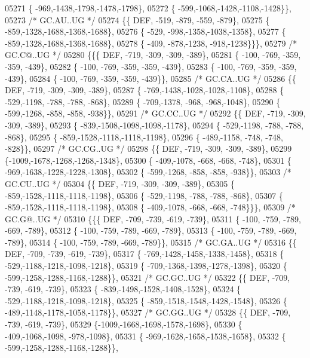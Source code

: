 \begin{DoxyCode}
05271 \{ -969,-1438,-1798,-1478,-1798\},
05272 \{ -599,-1068,-1428,-1108,-1428\}\},
05273 \textcolor{comment}{/* GC.AU..UG */}
05274 \{\{  DEF, -519, -879, -559, -879\},
05275 \{ -859,-1328,-1688,-1368,-1688\},
05276 \{ -529, -998,-1358,-1038,-1358\},
05277 \{ -859,-1328,-1688,-1368,-1688\},
05278 \{ -409, -878,-1238, -918,-1238\}\}\},
05279 \textcolor{comment}{/* GC.C@..UG */}
05280 \{\{\{  DEF, -719, -309, -309, -389\},
05281 \{ -100, -769, -359, -359, -439\},
05282 \{ -100, -769, -359, -359, -439\},
05283 \{ -100, -769, -359, -359, -439\},
05284 \{ -100, -769, -359, -359, -439\}\},
05285 \textcolor{comment}{/* GC.CA..UG */}
05286 \{\{  DEF, -719, -309, -309, -389\},
05287 \{ -769,-1438,-1028,-1028,-1108\},
05288 \{ -529,-1198, -788, -788, -868\},
05289 \{ -709,-1378, -968, -968,-1048\},
05290 \{ -599,-1268, -858, -858, -938\}\},
05291 \textcolor{comment}{/* GC.CC..UG */}
05292 \{\{  DEF, -719, -309, -309, -389\},
05293 \{ -839,-1508,-1098,-1098,-1178\},
05294 \{ -529,-1198, -788, -788, -868\},
05295 \{ -859,-1528,-1118,-1118,-1198\},
05296 \{ -489,-1158, -748, -748, -828\}\},
05297 \textcolor{comment}{/* GC.CG..UG */}
05298 \{\{  DEF, -719, -309, -309, -389\},
05299 \{-1009,-1678,-1268,-1268,-1348\},
05300 \{ -409,-1078, -668, -668, -748\},
05301 \{ -969,-1638,-1228,-1228,-1308\},
05302 \{ -599,-1268, -858, -858, -938\}\},
05303 \textcolor{comment}{/* GC.CU..UG */}
05304 \{\{  DEF, -719, -309, -309, -389\},
05305 \{ -859,-1528,-1118,-1118,-1198\},
05306 \{ -529,-1198, -788, -788, -868\},
05307 \{ -859,-1528,-1118,-1118,-1198\},
05308 \{ -409,-1078, -668, -668, -748\}\}\},
05309 \textcolor{comment}{/* GC.G@..UG */}
05310 \{\{\{  DEF, -709, -739, -619, -739\},
05311 \{ -100, -759, -789, -669, -789\},
05312 \{ -100, -759, -789, -669, -789\},
05313 \{ -100, -759, -789, -669, -789\},
05314 \{ -100, -759, -789, -669, -789\}\},
05315 \textcolor{comment}{/* GC.GA..UG */}
05316 \{\{  DEF, -709, -739, -619, -739\},
05317 \{ -769,-1428,-1458,-1338,-1458\},
05318 \{ -529,-1188,-1218,-1098,-1218\},
05319 \{ -709,-1368,-1398,-1278,-1398\},
05320 \{ -599,-1258,-1288,-1168,-1288\}\},
05321 \textcolor{comment}{/* GC.GC..UG */}
05322 \{\{  DEF, -709, -739, -619, -739\},
05323 \{ -839,-1498,-1528,-1408,-1528\},
05324 \{ -529,-1188,-1218,-1098,-1218\},
05325 \{ -859,-1518,-1548,-1428,-1548\},
05326 \{ -489,-1148,-1178,-1058,-1178\}\},
05327 \textcolor{comment}{/* GC.GG..UG */}
05328 \{\{  DEF, -709, -739, -619, -739\},
05329 \{-1009,-1668,-1698,-1578,-1698\},
05330 \{ -409,-1068,-1098, -978,-1098\},
05331 \{ -969,-1628,-1658,-1538,-1658\},
05332 \{ -599,-1258,-1288,-1168,-1288\}\},

\end{DoxyCode}
